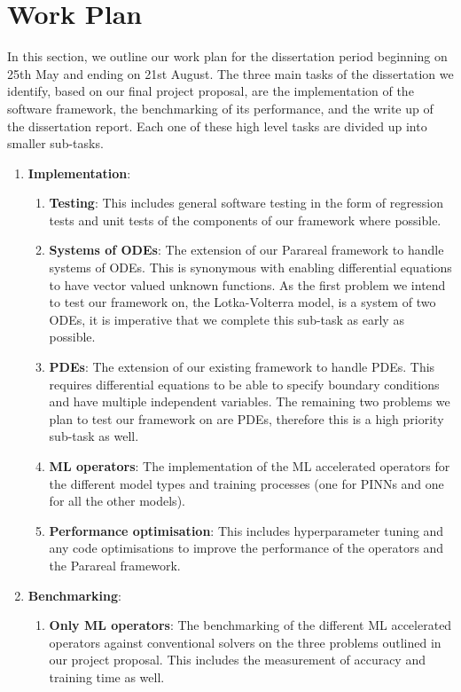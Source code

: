 \documentclass{article}
\begin{document}
\section{Work Plan}

In this section, we outline our work plan for the dissertation period beginning on 25th May and ending on 21st August. The three main tasks of the dissertation we identify, based on our final project proposal, are the implementation of the software framework, the benchmarking of its performance, and the write up of the dissertation report. Each one of these high level tasks are divided up into smaller sub-tasks.

\begin{enumerate}
    \item \textbf{Implementation}:
        \begin{enumerate}
        	\item \textbf{Testing}: This includes general software testing in the form of regression tests and unit tests of the components of our framework where possible.
        	\item \textbf{Systems of ODEs}: The extension of our Parareal framework to handle systems of ODEs. This is synonymous with enabling differential equations to have vector valued unknown functions. As the first problem we intend to test our framework on, the Lotka-Volterra model, is a system of two ODEs, it is imperative that we complete this sub-task as early as possible.
        	\item \textbf{PDEs}: The extension of our existing framework to handle PDEs. This requires differential equations to be able to specify boundary conditions and have multiple independent variables. The remaining two problems we plan to test our framework on are PDEs, therefore this is a high priority sub-task as well.
        	\item \textbf{ML operators}: The implementation of the ML accelerated operators for the different model types and training processes (one for PINNs and one for all the other models).
        	\item \textbf{Performance optimisation}: This includes hyperparameter tuning and any code optimisations to improve the performance of the operators and the Parareal framework.
        \end{enumerate}
    \item \textbf{Benchmarking}:
        \begin{enumerate}
        	\item \textbf{Only ML operators}: The benchmarking of the different ML accelerated operators against conventional solvers on the three problems outlined in our project proposal. This includes the measurement of accuracy and training time as well.

\end{enumerate}
\end{enumerate}
\end{document}
